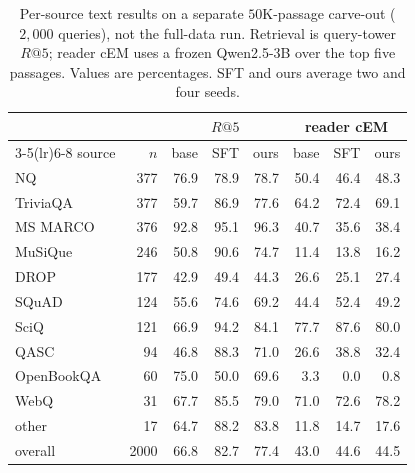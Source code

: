 \begin{table}[H]
\centering\small
\setlength{\tabcolsep}{5pt}
\caption{Per-source text results on a separate $50$K-passage carve-out ($2{,}000$ queries), not
the full-data run. Retrieval is query-tower $R@5$; reader cEM uses a frozen Qwen2.5-3B over the
top five passages. Values are percentages. SFT and ours average two and four seeds.}
\label{tab:rag_indomain}
\begin{tabular}{lrrrrrrr}
\toprule
 & & \multicolumn{3}{c}{$R@5$} & \multicolumn{3}{c}{reader cEM} \\
\cmidrule(lr){3-5}\cmidrule(lr){6-8}
source & $n$ & base & SFT & ours & base & SFT & ours \\
\midrule
NQ         & 377 & 76.9 & 78.9 & 78.7 & 50.4 & 46.4 & 48.3 \\
TriviaQA   & 377 & 59.7 & 86.9 & 77.6 & 64.2 & 72.4 & 69.1 \\
MS MARCO   & 376 & 92.8 & 95.1 & 96.3 & 40.7 & 35.6 & 38.4 \\
MuSiQue    & 246 & 50.8 & 90.6 & 74.7 & 11.4 & 13.8 & 16.2 \\
DROP       & 177 & 42.9 & 49.4 & 44.3 & 26.6 & 25.1 & 27.4 \\
SQuAD      & 124 & 55.6 & 74.6 & 69.2 & 44.4 & 52.4 & 49.2 \\
SciQ       & 121 & 66.9 & 94.2 & 84.1 & 77.7 & 87.6 & 80.0 \\
QASC       &  94 & 46.8 & 88.3 & 71.0 & 26.6 & 38.8 & 32.4 \\
OpenBookQA &  60 & 75.0 & 50.0 & 69.6 &  3.3 &  0.0 &  0.8 \\
WebQ       &  31 & 67.7 & 85.5 & 79.0 & 71.0 & 72.6 & 78.2 \\
other      &  17 & 64.7 & 88.2 & 83.8 & 11.8 & 14.7 & 17.6 \\
\midrule
overall    & 2000 & 66.8 & 82.7 & 77.4 & 43.0 & 44.6 & 44.5 \\
\bottomrule
\end{tabular}
\end{table}

